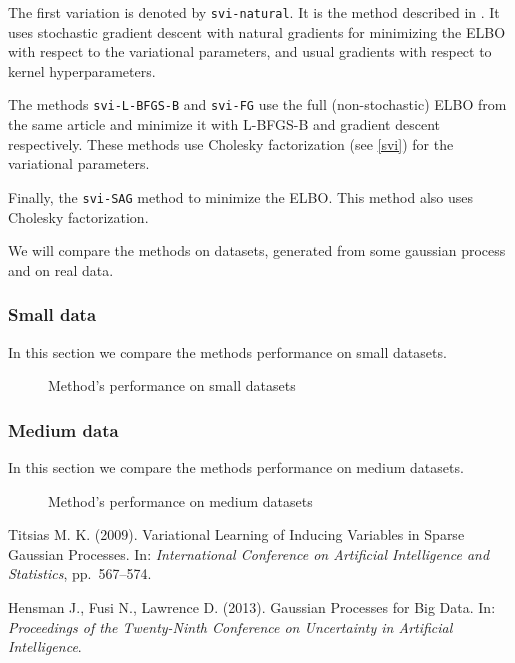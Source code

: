 \documentclass[12pt]{article}
\begin{document}
		The first variation is denoted by \lstinline{svi-natural}. It is the method described in \cite{BigData}. It uses stochastic gradient descent with natural gradients for minimizing the ELBO with respect to the variational parameters, and usual gradients with respect to kernel hyperparameters.

		The methods \lstinline{svi-L-BFGS-B} and \lstinline{svi-FG} use the full (non-stochastic) ELBO from the same article \cite{BigData} and minimize it with L-BFGS-B and gradient descent respectively. These methods use Cholesky factorization (see \ref{svi}) for the variational parameters.

		Finally, the \lstinline{svi-SAG} method to minimize the ELBO. This method also uses Cholesky factorization.

		We will compare the methods on datasets, generated from some gaussian process and on real data.

		\subsubsection{Small data}
			In this section we compare the methods performance on small datasets.

		\begin{figure}[!h]
			\centering
			\subfloat{
				\scalebox{0.9}{
					
				}
			}
			\subfloat{
				\scalebox{0.9}{
		    		
				}
			}
			\caption{Method's performance on small datasets}
			\label{hfn}
		\end{figure}

		\subsubsection{Medium data}
			In this section we compare the methods performance on medium datasets.

		\begin{figure}[!h]
			\centering
			\subfloat{
				\scalebox{0.9}{
					
				}
			}
			\subfloat{
				\scalebox{0.9}{
		    		
				}
			}
			\caption{Method's performance on medium datasets}
			\label{hfn}
		\end{figure}

\pagebreak
\begin{thebibliography}{99}

Titsias M. K. (2009).  Variational Learning of Inducing Variables in Sparse Gaussian
Processes.  In: {\it International Conference on Artificial Intelligence and Statistics}, pp.~567–574.

Hensman J., Fusi N., Lawrence D. (2013).  Gaussian Processes for Big Data.  In: {\it Proceedings of the Twenty-Ninth Conference on Uncertainty in Artificial Intelligence}.

\end{thebibliography}	
\end{document}
